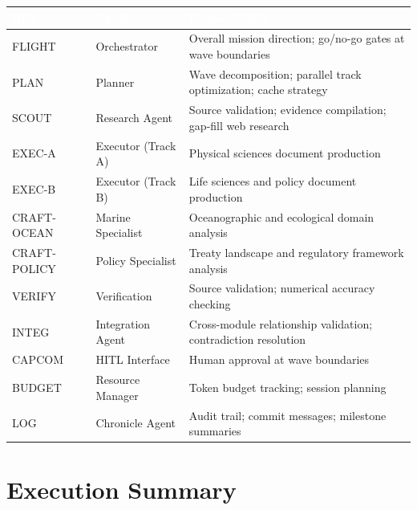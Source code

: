\documentclass[11pt,letterpaper]{article}
\newcommand{\tableheader}[1]{\textbf{\sffamily\textcolor{white}{#1}}}
\begin{document}
\begin{center}
\begin{tabularx}{\textwidth}{L{2cm}L{2.5cm}X}
\toprule
{}
\tableheader{Role} & \tableheader{Agent} & \tableheader{Responsibility} \\
\midrule
FLIGHT & Orchestrator & Overall mission direction; go/no-go gates at wave boundaries \\
PLAN & Planner & Wave decomposition; parallel track optimization; cache strategy \\
SCOUT & Research Agent & Source validation; evidence compilation; gap-fill web research \\
EXEC-A & Executor (Track A) & Physical sciences document production \\
EXEC-B & Executor (Track B) & Life sciences and policy document production \\
CRAFT-OCEAN & Marine Specialist & Oceanographic and ecological domain analysis \\
CRAFT-POLICY & Policy Specialist & Treaty landscape and regulatory framework analysis \\
VERIFY & Verification & Source validation; numerical accuracy checking \\
INTEG & Integration Agent & Cross-module relationship validation; contradiction resolution \\
CAPCOM & HITL Interface & Human approval at wave boundaries \\
BUDGET & Resource Manager & Token budget tracking; session planning \\
LOG & Chronicle Agent & Audit trail; commit messages; milestone summaries \\
\bottomrule
\end{tabularx}
\end{center}

\section{Execution Summary}
\end{document}
